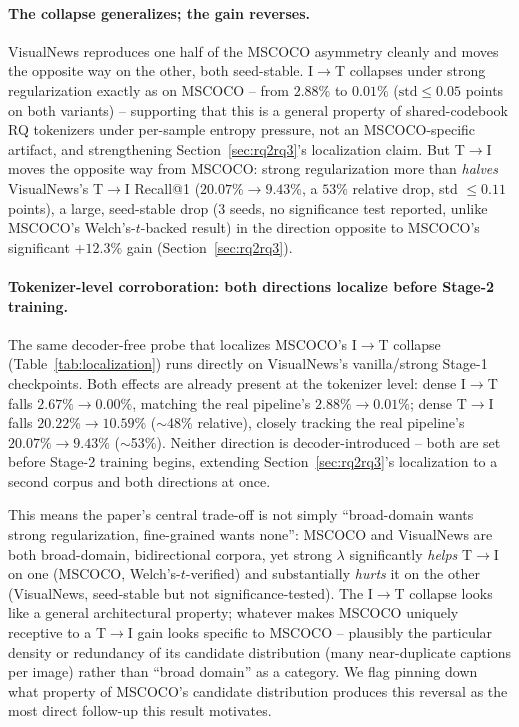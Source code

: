 \paragraph{The collapse generalizes; the gain reverses.} VisualNews reproduces one half of the MSCOCO asymmetry cleanly and moves the opposite way on the other, both seed-stable. I$\to$T collapses under strong regularization exactly as on MSCOCO -- from $2.88\%$ to $0.01\%$ ($\text{std}\leq0.05$ points on both variants) -- supporting that this is a general property of shared-codebook RQ tokenizers under per-sample entropy pressure, not an MSCOCO-specific artifact, and strengthening Section~\ref{sec:rq2rq3}'s localization claim. But T$\to$I moves the opposite way from MSCOCO: strong regularization more than \emph{halves} VisualNews's T$\to$I Recall@1 ($20.07\%\to9.43\%$, a $53\%$ relative drop, std $\leq0.11$ points), a large, seed-stable drop (3 seeds, no significance test reported, unlike MSCOCO's Welch's-$t$-backed result) in the direction opposite to MSCOCO's significant $+12.3\%$ gain (Section~\ref{sec:rq2rq3}).

\paragraph{Tokenizer-level corroboration: both directions localize before Stage-2 training.} The same decoder-free probe that localizes MSCOCO's I$\to$T collapse (Table~\ref{tab:localization}) runs directly on VisualNews's vanilla/strong Stage-1 checkpoints. Both effects are already present at the tokenizer level: dense I$\to$T falls $2.67\%\to0.00\%$, matching the real pipeline's $2.88\%\to0.01\%$; dense T$\to$I falls $20.22\%\to10.59\%$ ($\sim$48\% relative), closely tracking the real pipeline's $20.07\%\to9.43\%$ ($\sim$53\%). Neither direction is decoder-introduced -- both are set before Stage-2 training begins, extending Section~\ref{sec:rq2rq3}'s localization to a second corpus and both directions at once.

This means the paper's central trade-off is not simply ``broad-domain wants strong regularization, fine-grained wants none'': MSCOCO and VisualNews are both broad-domain, bidirectional corpora, yet strong $\lambda$ significantly \emph{helps} T$\to$I on one (MSCOCO, Welch's-$t$-verified) and substantially \emph{hurts} it on the other (VisualNews, seed-stable but not significance-tested). The I$\to$T collapse looks like a general architectural property; whatever makes MSCOCO uniquely receptive to a T$\to$I gain looks specific to MSCOCO -- plausibly the particular density or redundancy of its candidate distribution (many near-duplicate captions per image) rather than ``broad domain'' as a category. We flag pinning down what property of MSCOCO's candidate distribution produces this reversal as the most direct follow-up this result motivates.
